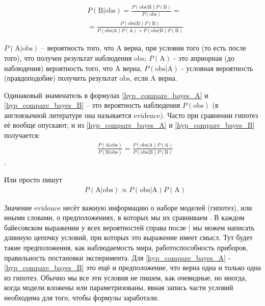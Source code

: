 \documentclass{book}
\begin{document}
\begin{align}\label{hyp_compare_bayes_B}
   &P\left(\text{B|obs}\right)=
   \frac{P\left(\text{obs|B}\right) P\left(\text{B}\right)}{P\left(\text{obs}\right)} = \nonumber \\
   &=\frac{P\left(\text{obs|B}\right) P\left(\text{B}\right)}{P\left(\text{obs|A}\right) P\left(\text{A}\right)+P\left(\text{obs|B}\right) P\left(\text{B}\right)}
\end{align}


$P\left(\text{A|obs}\right)$ -- вероятность того, что $\text{A}$ верна, при условии того (то есть после того), что получен результат наблюдения $\text{obs}$; $P\left(\text{A}\right)$ - это априорная (до наблюдения) вероятность того, что $\text{A}$ верна, $P\left(\text{obs|A}\right)$ - условная вероятность (правдоподобие) получить результат $\text{obs}$, если $\text{A}$ верна.

Одинаковый знаменатель в формулах \eqref{hyp_compare_bayes_A} и \eqref{hyp_compare_bayes_B} -- это вероятность наблюдения $P\left(\text{obs}\right)$ (в англоязычной литературе она называется evidence). Часто при сравнении гипотез её вообще опускают, и из \eqref{hyp_compare_bayes_A} и \eqref{hyp_compare_bayes_B} получается:
\begin{align}\label{hyp_compare_bayes_comp}
   &\frac{P\left(\text{A|obs}\right)}{P\left(\text{B|obs}\right)}=\frac{P\left(\text{obs|A}\right) P\left(\text{A}\right)}{P\left(\text{obs|B}\right) P\left(\text{B}\right)}
\end{align}.

Или просто пишут 
\begin{align}\label{hyp_compare_bayes_null_prop}
   &P\left(\text{A|obs}\right)\propto P\left(\text{obs|A}\right) P\left(\text{A}\right)
\end{align}

 Значение evidence несёт важную информацию о наборе моделей (гипотез), или иными словами, о предположениях, в которых мы их сравниваем \citep[подробнее см.][]{skilling_nested_2006}. В каждом байесовском выражении у всех вероятностей справа после $\text{|}$ мы можем написать длинную цепочку условий, при которых это выражение имеет смысл. Тут будет такие предположения, как наблюдаемость мира, работоспособность приборов, правильность постановки эксперимента. Для \eqref{hyp_compare_bayes_A} - \eqref{hyp_compare_bayes_B} это ещё и предположение, что верна одна и только одна из гипотез. Обычно мы все эти условия не пишем, как очевидные, но иногда, когда модели вложены или параметризованы, явная запись части условий необходима для того, чтобы формулы заработали. 
 
\end{document}
